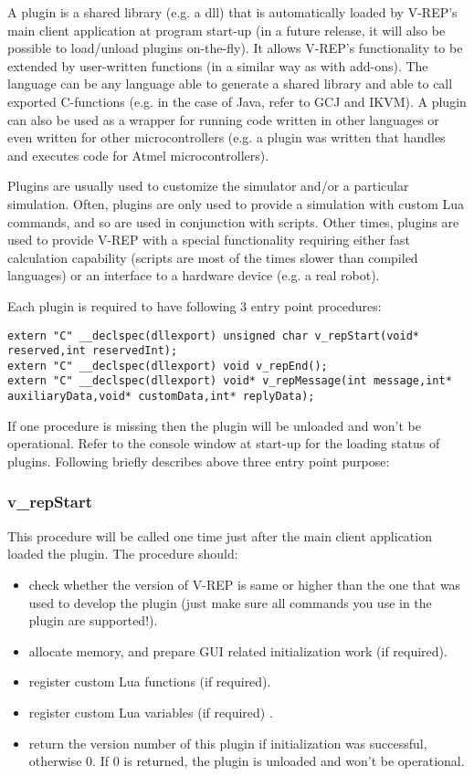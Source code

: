 \label{plugins}

A plugin is a shared library (e.g. a dll) that is automatically loaded by 
V-REP's main client application at program start-up (in a future release, it 
will also be possible to load/unload plugins on-the-fly). It allows V-REP's
functionality to be extended by user-written functions (in a similar way as 
with add-ons). The language can be any language able to generate a shared 
library and able to call exported C-functions (e.g. in the case of Java, 
refer to GCJ and IKVM). A plugin can also be used as a wrapper for running 
code written in other languages or even written for other microcontrollers 
(e.g. a plugin was written that handles and executes code for Atmel 
microcontrollers).

Plugins are usually used to customize the simulator and/or a particular 
simulation. Often, plugins are only used to provide a simulation with custom
Lua commands, and so are used in conjunction with scripts. Other times, 
plugins are used to provide V-REP with a special functionality requiring 
either fast calculation capability (scripts are most of the times slower 
than compiled languages) or an interface to a hardware device (e.g. a real 
robot).

Each plugin is required to have following 3 entry point procedures:
\begin{verbatim}
extern "C" __declspec(dllexport) unsigned char v_repStart(void* reserved,int reservedInt);
extern "C" __declspec(dllexport) void v_repEnd();
extern "C" __declspec(dllexport) void* v_repMessage(int message,int* auxiliaryData,void* customData,int* replyData);
\end{verbatim}

If one procedure is missing then the plugin will be unloaded and won't be 
operational. Refer to the console window at start-up for the loading status 
of plugins. Following briefly describes above three entry point purpose:

\subsubsection{v\_repStart}

This procedure will be called one time just after the main client application 
loaded the plugin. The procedure should:

\begin{itemize}[nosep]
\item check whether the version of V-REP is same or higher than the one that 
	was used to develop the plugin (just make sure all commands you use in the 
	plugin are supported!).
\item allocate memory, and prepare GUI related initialization work (if required).
\item register custom Lua functions (if required).
\item register custom Lua variables (if required) .
\item return the version number of this plugin if initialization was 
	successful, otherwise 0. If 0 is returned, the plugin is unloaded and 
	won't be operational.
\end{itemize}

